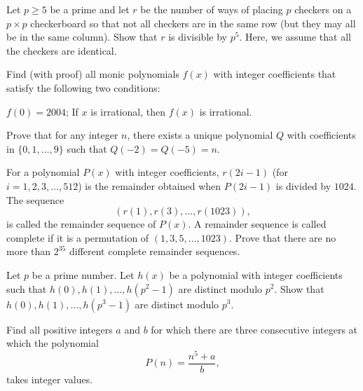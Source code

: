 \documentclass[12pt,a4paper]{memoir}
\theoremstyle{definition}
\begin{document}
\begin{question}[name={2006 APMO}]
	Let $p\ge5$ be a prime and let $r$ be the number of ways of placing $p$ checkers on a $p\times p$ checkerboard so that not all checkers are in the same row (but they may all be in the same column). Show that $r$ is divisible by $p^5$. Here, we assume that all the checkers are identical.
\end{question}

\begin{question}[name={2004 Bay Area Math Olympiad}]
	Find (with proof) all monic polynomials $f(x)$ with integer coefficients that satisfy the following two conditions:
	\begin{tasks}
		\task $f(0)=2004$;
		\task If $x$ is irrational, then $f(x)$ is irrational.
	\end{tasks}
\end{question}

\begin{question}[name={1997 USAMO}]
	Prove that for any integer $n$, there exists a unique polynomial $Q$ with coefficients in $\{0,1,\ldots,9\}$ such that $Q(-2) = Q(-5) = n$.
\end{question}

\begin{question}[name={2007 USA TST}]
	For a polynomial $ P(x)$ with integer coefficients, $r(2i - 1)$ (for $ i = 1,2,3,\dots,512$) is the remainder obtained when $ P(2i - 1)$ is divided by $ 1024$. The sequence
	\[ (r(1),r(3),\dots,r(1023)),\]
	is called the remainder sequence of $P(x)$. A remainder sequence is called complete if it is a permutation of $(1,3,5,\ldots,1023)$. Prove that there are no more than $ 2^{35}$ different complete remainder sequences.
\end{question}

\begin{question}[name={2008 Putnam}]
	Let $p$ be a prime number. Let $h(x)$ be a polynomial with integer coefficients such that $h(0),h(1),\dots, h(p^2-1)$ are distinct modulo $p^2$. Show that $h(0),h(1),\dots, h(p^3-1)$ are distinct modulo $p^3$.
\end{question}

\begin{question}[name={2013 EGMO}]
	Find all positive integers $a$ and $b$ for which there are three consecutive integers at which the polynomial\[ P(n) = \frac{n^5+a}{b}, \] takes integer values.
\end{question}
\end{document}
